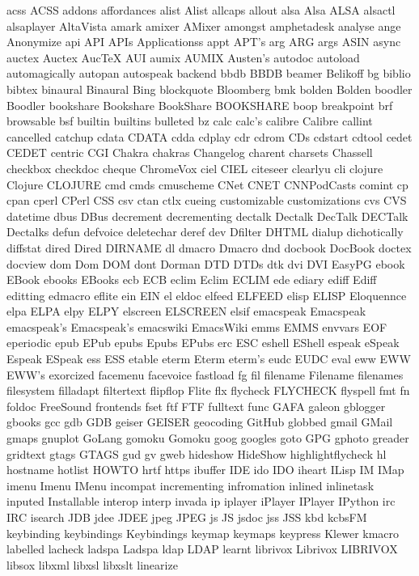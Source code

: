 acss
ACSS
addons
affordances
alist
Alist
allcaps
allout
alsa
Alsa
ALSA
alsactl
alsaplayer
AltaVista
amark
amixer
AMixer
amongst
amphetadesk
analyse
ange
Anonymize
api
API
APIs
Applicationss
appt
APT's
arg
ARG
args
ASIN
async
auctex
Auctex
AucTeX
AUI
aumix
AUMIX
Austen's
autodoc
autoload
automagically
autopan
autospeak
backend
bbdb
BBDB
beamer
Belikoff
bg
biblio
bibtex
binaural
Binaural
Bing
blockquote
Bloomberg
bmk
bolden
Bolden
boodler
Boodler
bookshare
Bookshare
BookShare
BOOKSHARE
boop
breakpoint
brf
browsable
bsf
builtin
builtins
bulleted
bz
calc
calc's
calibre
Calibre
callint
cancelled
catchup
cdata
CDATA
cdda
cdplay
cdr
cdrom
CDs
cdstart
cdtool
cedet
CEDET
centric
CGI
Chakra
chakras
Changelog
charent
charsets
Chassell
checkbox
checkdoc
cheque
ChromeVox
ciel
CIEL
citeseer
clearlyu
cli
clojure
Clojure
CLOJURE
cmd
cmds
cmuscheme
CNet
CNET
CNNPodCasts
comint
cp
cpan
cperl
CPerl
CSS
csv
ctan
ctlx
cueing
customizable
customizations
cvs
CVS
datetime
dbus
DBus
decrement
decrementing
dectalk
Dectalk
DecTalk
DECTalk
Dectalks
defun
defvoice
deletechar
deref
dev
Dfilter
DHTML
dialup
dichotically
diffstat
dired
Dired
DIRNAME
dl
dmacro
Dmacro
dnd
docbook
DocBook
doctex
docview
dom
Dom
DOM
dont
Dorman
DTD
DTDs
dtk
dvi
DVI
EasyPG
ebook
EBook
ebooks
EBooks
ecb
ECB
eclim
Eclim
ECLIM
ede
ediary
ediff
Ediff
editting
edmacro
eflite
ein
EIN
el
eldoc
elfeed
ELFEED
elisp
ELISP
Eloquennce
elpa
ELPA
elpy
ELPY
elscreen
ELSCREEN
elsif
emacspeak
Emacspeak
emacspeak's
Emacspeak's
emacswiki
EmacsWiki
emms
EMMS
envvars
EOF
eperiodic
epub
EPub
epubs
Epubs
EPubs
erc
ESC
eshell
EShell
espeak
eSpeak
Espeak
ESpeak
ess
ESS
etable
eterm
Eterm
eterm's
eudc
EUDC
eval
eww
EWW
EWW's
exorcized
facemenu
facevoice
fastload
fg
fil
filename
Filename
filenames
filesystem
filladapt
filtertext
flipflop
Flite
flx
flycheck
FLYCHECK
flyspell
fmt
fn
foldoc
FreeSound
frontends
fset
ftf
FTF
fulltext
func
GAFA
galeon
gblogger
gbooks
gcc
gdb
GDB
geiser
GEISER
geocoding
GitHub
globbed
gmail
GMail
gmaps
gnuplot
GoLang
gomoku
Gomoku
goog
googles
goto
GPG
gphoto
greader
gridtext
gtags
GTAGS
gud
gv
gweb
hideshow
HideShow
highlightflycheck
hl
hostname
hotlist
HOWTO
hrtf
https
ibuffer
IDE
ido
IDO
iheart
ILisp
IM
IMap
imenu
Imenu
IMenu
incompat
incrementing
infromation
inlined
inlinetask
inputed
Installable
interop
interp
invada
ip
iplayer
iPlayer
IPlayer
IPython
irc
IRC
isearch
JDB
jdee
JDEE
jpeg
JPEG
js
JS
jsdoc
jss
JSS
kbd
kcbsFM
keybinding
keybindings
Keybindings
keymap
keymaps
keypress
Klewer
kmacro
labelled
lacheck
ladspa
Ladspa
ldap
LDAP
learnt
librivox
Librivox
LIBRIVOX
libsox
libxml
libxsl
libxslt
linearize
